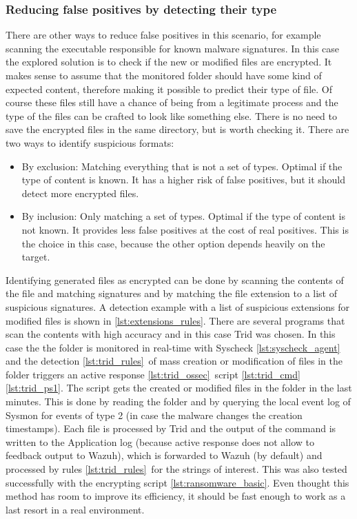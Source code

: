 \subsubsection{Reducing false positives by detecting their type}
There are other ways to reduce false positives in this scenario, for example scanning the executable responsible for known malware signatures.
In this case the explored solution is to check if the new or modified files are encrypted.
\linej
It makes sense to assume that the monitored folder should have some kind of expected content, therefore making it possible to predict their type of file.
Of course these files still have a chance of being from a legitimate process and the type of the files can be crafted to look like something else.
There is no need to save the encrypted files in the same directory, but is worth checking it.
\linej
There are two ways to identify suspicious formats:
\begin{itemize}
	\item By exclusion: Matching everything that is not a set of types. Optimal if the type of content is known. It has a higher risk of false positives, but it should detect more encrypted files.
	\item By inclusion: Only matching a set of types. Optimal if the type of content is not known. It provides less false positives at the cost of real positives. This is the choice in this case, because the other option depends heavily on the target.
\end{itemize}
\linej
Identifying generated files as encrypted can be done by scanning the contents of the file and matching signatures and by matching the file extension to a list of suspicious signatures.
A detection example with a list of suspicious extensions\cite{crypto_ransomware_extensions} for modified files is shown in \ref{lst:extensions_rules}.
There are several programs that scan the contents with high accuracy and in this case Trid\cite{trid} was chosen.
\linej
\linej
In this case the the folder is monitored in real-time with Syscheck \ref{lst:syscheck_agent} and the detection \ref{lst:trid_rules}\ of mass creation or modification of files in the folder triggers an active response \ref{lst:trid_ossec}\ script \ref{lst:trid_cmd}\ref{lst:trid_ps1}.
\linej
The script gets the created or modified files in the folder in the last minutes.
This is done by reading the folder and by querying the local event log of Sysmon for events of type 2 (in case the malware changes the creation timestamps).
\linej
Each file is processed by Trid and the output of the command is written to the Application log (because active response does not allow to feedback output to Wazuh), which is forwarded to Wazuh (by default) and processed by rules \ref{lst:trid_rules}\ for the strings of interest.
\linej
\linej
This was also tested successfully with the encrypting script \ref{lst:ransomware_basic}.
Even thought this method has room to improve its efficiency, it should be fast enough to work as a last resort in a real environment.

